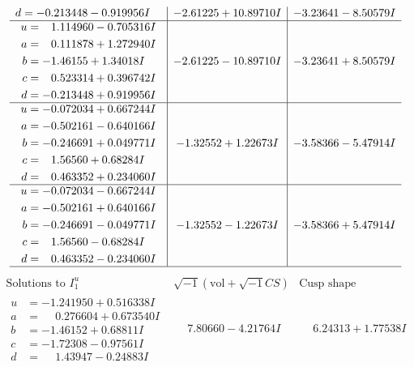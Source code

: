 \documentclass[1p]{elsarticle_modified}
\theoremstyle{definition}
\newcommand{\I}{\sqrt{-1}}
\begin{document}
$$\begin{array}{c|c|c}
\begin{aligned}
d &= -0.213448 - 0.919956 I\end{aligned}
 & -2.61225 + 10.89710 I & -3.23641 - 8.50579 I \\ \hline\begin{aligned}
u &= \phantom{-}1.114960 - 0.705316 I \\
a &= \phantom{-}0.111878 + 1.272940 I \\
b &= -1.46155 + 1.34018 I \\
c &= \phantom{-}0.523314 + 0.396742 I \\
d &= -0.213448 + 0.919956 I\end{aligned}
 & -2.61225 - 10.89710 I & -3.23641 + 8.50579 I \\ \hline\begin{aligned}
u &= -0.072034 + 0.667244 I \\
a &= -0.502161 - 0.640166 I \\
b &= -0.246691 + 0.049771 I \\
c &= \phantom{-}1.56560 + 0.68284 I \\
d &= \phantom{-}0.463352 + 0.234060 I\end{aligned}
 & -1.32552 + 1.22673 I & -3.58366 - 5.47914 I \\ \hline\begin{aligned}
u &= -0.072034 - 0.667244 I \\
a &= -0.502161 + 0.640166 I \\
b &= -0.246691 - 0.049771 I \\
c &= \phantom{-}1.56560 - 0.68284 I \\
d &= \phantom{-}0.463352 - 0.234060 I\end{aligned}
 & -1.32552 - 1.22673 I & -3.58366 + 5.47914 I\\
 \hline 
 \end{array}$$\newpage$$\begin{array}{c|c|c}  
\text{Solutions to }I^u_{1}& \I (\text{vol} + \sqrt{-1}CS) & \text{Cusp shape}\\
 \hline 
\begin{aligned}
u &= -1.241950 + 0.516338 I \\
a &= \phantom{-}0.276604 + 0.673540 I \\
b &= -1.46152 + 0.68811 I \\
c &= -1.72308 - 0.97561 I \\
d &= \phantom{-}1.43947 - 0.24883 I\end{aligned}
 & \phantom{-}7.80660 - 4.21764 I & \phantom{-}6.24313 + 1.77538 I \\ \hline\begin{aligned}

\end{aligned}
\end{array}$$
\end{document}
